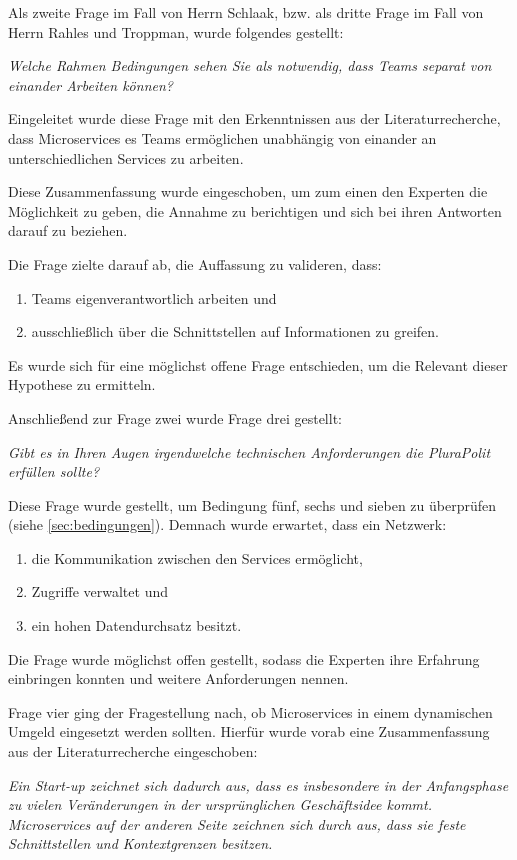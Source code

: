 Als zweite Frage im Fall von Herrn Schlaak, bzw. als dritte Frage im Fall von Herrn Rahles und Troppman, wurde folgendes gestellt:

\textit{Welche Rahmen Bedingungen sehen Sie als notwendig, dass Teams separat von einander Arbeiten können?}

Eingeleitet wurde diese Frage mit den Erkenntnissen aus der Literaturrecherche, dass Microservices es Teams ermöglichen unabhängig von einander an unterschiedlichen Services zu arbeiten.

Diese Zusammenfassung wurde eingeschoben, um zum einen den Experten die Möglichkeit zu geben, die Annahme zu berichtigen und sich bei ihren Antworten darauf zu beziehen.

Die Frage zielte darauf ab, die Auffassung zu valideren, dass:
\begin{enumerate}
	\item Teams eigenverantwortlich arbeiten und
	\item ausschließlich über die Schnittstellen auf Informationen zu greifen.
\end{enumerate}
Es wurde sich für eine möglichst offene Frage entschieden, um die Relevant dieser Hypothese zu ermitteln.

Anschließend zur Frage zwei wurde Frage drei gestellt:

\textit{Gibt es in Ihren Augen irgendwelche technischen Anforderungen die PluraPolit erfüllen sollte? }

Diese Frage wurde gestellt, um Bedingung fünf, sechs und sieben zu überprüfen (siehe \cref{sec:bedingungen}). Demnach wurde erwartet, dass ein Netzwerk: 

\begin{enumerate}
	\item die Kommunikation zwischen den Services ermöglicht,
	\item Zugriffe verwaltet und
	\item ein hohen Datendurchsatz besitzt.
\end{enumerate}

Die Frage wurde möglichst offen gestellt, sodass die Experten ihre Erfahrung einbringen konnten und weitere Anforderungen nennen.

Frage vier ging der Fragestellung nach, ob Microservices in einem dynamischen Umgeld eingesetzt werden sollten. Hierfür wurde vorab eine Zusammenfassung aus der Literaturrecherche eingeschoben:

\textit{Ein Start-up zeichnet sich dadurch aus, dass es insbesondere in der Anfangsphase zu vielen Veränderungen in der ursprünglichen Geschäftsidee kommt. Microservices auf der anderen Seite zeichnen sich durch aus, dass sie feste Schnittstellen und Kontextgrenzen besitzen.}


